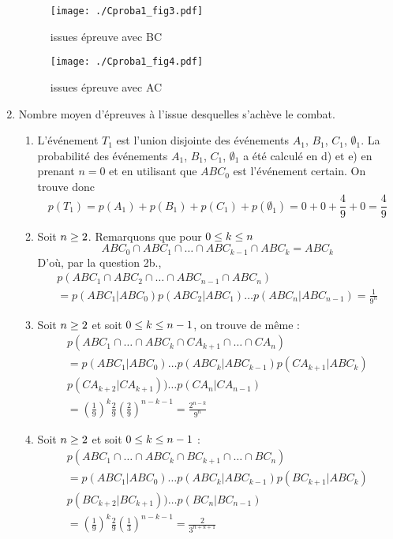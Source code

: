 \begin{enumerate}
\begin{figure}[h!]
  \begin{minipage}{7cm}
    \centering
    \texttt{[image: ./Cproba1\_fig3.pdf]}
    \caption{issues épreuve avec BC}
    \label{fig:Cproba1_fig3}
  \end{minipage}
  \begin{minipage}{7cm}
    \centering
    \texttt{[image: ./Cproba1\_fig4.pdf]}
    \caption{issues épreuve avec AC}
    \label{fig:Cproba1_fig4}
  \end{minipage}
\end{figure}


\item Nombre moyen d'épreuves à l'issue desquelles s'achève le combat.
\begin{enumerate}
\item L'événement $T_1$ est l'union disjointe des événements $A_1$, $B_1$, $C_1$, $\emptyset_{1}$.  La probabilité des événements $A_1$, $B_1$, $C_1$, $\emptyset_{1}$ a été calculé en d) et e) en prenant $n=0$ et en utilisant que $ABC_0$ est l'événement certain. On trouve donc 
$$p(T_1)=p(A_1)+p(B_1)+p(C_1)+p(\emptyset_{1})=0+0+\frac49+0=\frac 49$$
\item Soit $n\geq 2$. Remarquons que pour $0\leq k\leq n$
$$ABC_0 \cap ABC_1 \cap \dots \cap ABC_{k-1} \cap ABC_k=ABC_k$$
D'où, par la question 2b.,
\begin{multline*}
p(ABC_1 \cap ABC_2 \cap \dots \cap ABC_{n-1} \cap ABC_n)\\
 = p(ABC_1|ABC_0)p(ABC_2|ABC_1)\dots p(ABC_{n}|ABC_{n-1})= \frac1{9^n}  
\end{multline*}

\item Soit $n \geq 2$ et soit $0 \leq k \leq n - 1$, on trouve de même :
\begin{multline*}
p(ABC_1 \cap \dots \cap ABC_k \cap CA_{k+1} \cap \dots \cap CA_n)\\
 = p(ABC_1|ABC_0)\dots p(ABC_{k}|ABC_{k-1})p(CA_{k+1}|ABC_k)\\
  p(CA_{k+2}|CA_{k+1}))\dots p(CA_{n}|CA_{n-1})\\
 = \left(\frac19\right)^k\frac 29 \left(\frac 29\right)^{n-k-1}
 = \frac{2^{n-k}}{9^n}  
\end{multline*}

\item Soit $n \geq 2$ et soit $0 \leq k \leq n - 1$ :
\begin{multline*}
p(ABC_1 \cap \dots \cap ABC_k \cap BC_{k+1} \cap \dots \cap BC_n)\\
 = p(ABC_1|ABC_0)\dots p(ABC_{k}|ABC_{k-1})p(BC_{k+1}|ABC_k)\\
  p(BC_{k+2}|BC_{k+1}))\dots p(BC_{n}|BC_{n-1})\\
 = \left(\frac19\right)^k\frac 29 \left(\frac 13\right)^{n-k-1}
 = \frac{2}{3^{n+k+1}}
\end{multline*}


\end{enumerate}
\end{enumerate}
